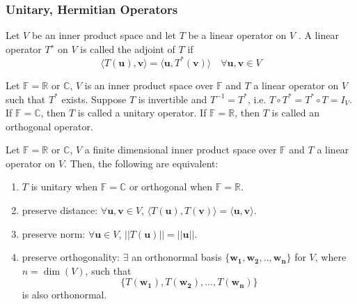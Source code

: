 \documentclass[a4paper]{article}
\begin{document}
\subsubsection*{Unitary, Hermitian Operators}
\begin{defi}[Adjoint]
Let $V$ be an inner product space and let $T$ be a linear operator on $V$ . A linear operator $T^∗$ on $V$ is called the adjoint of $T$ if 
$$\langle T(\mathbf{u}),\mathbf{v}\rangle=\langle\mathbf{u},T^*(\mathbf{v})\rangle\quad\forall\mathbf{u},\mathbf{v}\in V$$
\end{defi}
\begin{defi}
Let $\mathbb{F}=\mathbb{R}$ or $\mathbb{C}$, $V$ is an inner product space over $\mathbb{F}$ and $T$ a linear operator on $V$ such that $T^*$ exists. Suppose $T$ is invertible and $T^{-1}=T^*$, i.e. $T\circ T^*=T^*\circ T=I_V$. If $\mathbb{F}=\mathbb{C}$, then $T$ is called a unitary operator. If $\mathbb{F}=\mathbb{R}$, then $T$ is called an orthogonal operator.
\end{defi}
\begin{thm}
Let $\mathbb{F}=\mathbb{R}$ or $\mathbb{C}$, $V$ a finite dimensional inner product space over $\mathbb{F}$ and $T$ a linear operator on $V$. Then, the following are equivalent:
\begin{enumerate}
    \item $T$ is unitary when $\mathbb{F}=\mathbb{C}$ or orthogonal when $\mathbb{F}=\mathbb{R}$.
    \item preserve distance: $\forall\mathbf{u},\mathbf{v}\in V$, $\langle T(\mathbf{u}),T(\mathbf{v})\rangle=\langle\mathbf{u},\mathbf{v}\rangle$.
    \item preserve norm: $\forall\mathbf{u}\in V$, $||T(\mathbf{u})||=||\mathbf{u}||$.
    \item preserve orthogonality: $\exists$ an orthonormal basis $\{\mathbf{w_1},\mathbf{w_2},..,\mathbf{w_n}\}$ for $V$, where $n=\dim(V)$, such that $$\{T(\mathbf{w_1}),T(\mathbf{w_2}),...,T(\mathbf{w_n})\}$$ is also orthonormal.
\end{enumerate}
\end{thm}
\end{document}
